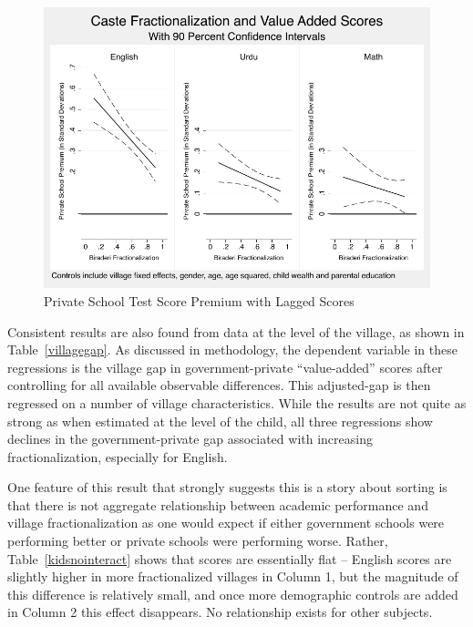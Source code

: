 \documentclass[12pt]{article}
\begin{document}
\begin{figure}[h]
	\caption{Private School Test Score Premium with Lagged Scores}\label{kidscombined}
	\centering	
	\includegraphics[scale=0.8]{graphs/kids_combined.pdf}
\end{figure}



Consistent results are also found from data at the level of the village, as shown in Table~\ref{villagegap}. As discussed in methodology, the dependent variable in these regressions is the village gap in government-private ``value-added'' scores after controlling for all available observable differences. This adjusted-gap is then regressed on a number of village characteristics. While the results are not quite as strong as when estimated at the level of the child, all three regressions show declines in the government-private gap associated with increasing fractionalization, especially for English. 



One feature of this result that strongly suggests this is a story about sorting is that there is not aggregate relationship between academic performance and village fractionalization as one would expect if either government schools were performing better or private schools were performing worse. Rather, Table~\ref{kidsnointeract} shows that scores are essentially flat -- English scores are slightly higher in more fractionalized villages in Column 1, but the magnitude of this difference is relatively small, and once more demographic controls are added in Column 2 this effect disappears. No relationship exists for other subjects. 
\end{document}
